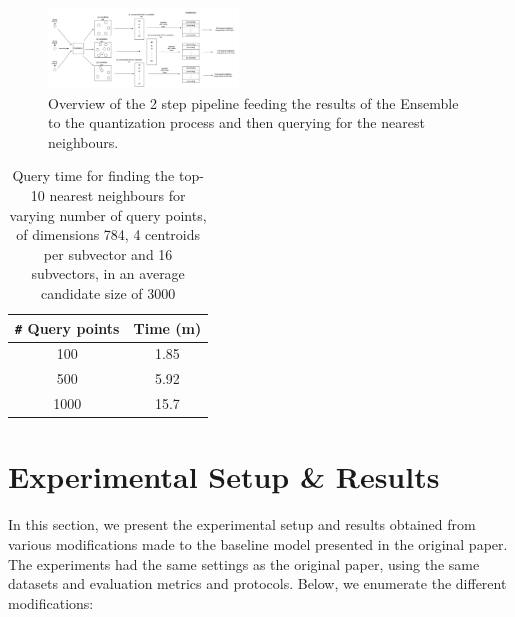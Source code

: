 \documentclass[sigconf, nonacm]{acmart}
\begin{document}
\begin{figure}[ht]
    \centering
    \includegraphics[width=0.45\textwidth]{plots/product_quantization_shape.jpg}
    \caption{Overview of the 2 step pipeline feeding the results of the Ensemble to the quantization process and then querying for the nearest neighbours.} 
  \label{fig:quantization}
\end{figure}


\begin{table}[ht]
\centering
\caption{Query time for finding the top-10 nearest neighbours for varying number of query points, of dimensions 784, 4 centroids per subvector and 16 subvectors, in an average candidate size of 3000}
\begin{tabular}{c c}
\toprule
\texttt{\#} Query points & Time (m)\\ 
\midrule
100 &  1.85\\ 
500 & 5.92\\ 
1000 & 15.7\\
\bottomrule
\end{tabular}
\label{table:params}
\end{table}


\section{Experimental Setup \& Results}

In this section, we present the experimental setup and results obtained from various modifications made to the baseline model presented in the original paper. The experiments had the same settings as the original paper, using the same datasets and evaluation metrics and protocols\cite{neural}. Below, we enumerate the different modifications:
\end{document}
